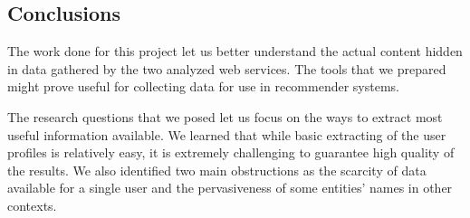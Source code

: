\subsection{Conclusions}

The work done for this project let us better understand the actual content
hidden in data gathered by the two analyzed web services. The tools that we
prepared might prove useful for collecting data for use in recommender systems.

The research questions that we posed let us focus on the ways to extract most
useful information available. We learned that while basic extracting of the
user profiles is relatively easy, it is extremely challenging to guarantee high
quality of the results. We also identified two main obstructions as the
scarcity of data available for a single user and the pervasiveness of some
entities' names in other contexts.
